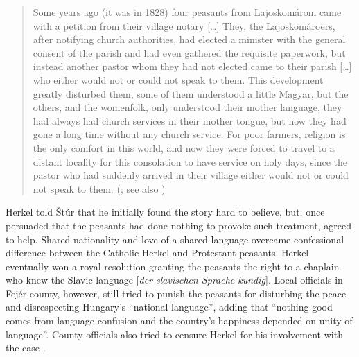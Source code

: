\begin{quote}
    Some years ago (it was in 1828) four peasants from Lajoskomárom came with a petition from their village notary […] They, the Lajoskomároers, after notifying church authorities, had elected a minister with the general consent of the parish and had even gathered the requisite paperwork, but instead another pastor whom they had not elected came to their parish […] who either would not or could not speak to them. This development greatly disturbed them, some of them understood a little Magyar, but the others, and the womenfolk, only understood their mother language, they had always had church services in their mother tongue, but now they had gone a long time without any church service. For poor farmers, religion is the only comfort in this world, and now they were forced to travel to a distant locality for this consolation to have service on holy days, since the pastor who had suddenly arrived in their village either would not or could not speak to them. (\cite[24--25]{stur_neunzehnte_1845}; see also \cite[589--603]{kis_emlekezesei_1890})
\end{quote}


Herkel told Štúr that he initially found the story hard to believe, but, once persuaded that the peasants had done nothing to provoke such treatment, agreed to help. Shared nationality and love of a shared language overcame confessional difference between the Catholic Herkel and Protestant peasants. Herkel eventually won a royal resolution granting the peasants the right to a chaplain who knew the Slavic language [\textit{der slavischen Sprache kundig}]. Local officials in Fejér county, however, still tried to punish the peasants for disturbing the peace and disrespecting Hungary’s “national language”, adding that “nothing good comes from language confusion and the country’s happiness depended on unity of language”. County officials also tried to censure Herkel for his involvement with the case \citep[26--27]{stur_neunzehnte_1845}.

